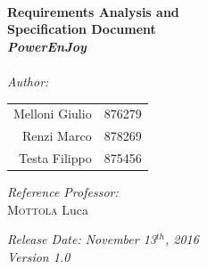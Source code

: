 \begin{titlepage}
\HRule \\[0.4cm]
{ \huge \bfseries Requirements Analysis and\\Specification Document\\[0.5cm]\textit{PowerEnJoy}}\\[0.4cm] %
\HRule \\[1.5cm]
 
\Large \emph{Author:}\\
\LARGE{
\begin{center}
\begin{tabular}{ r  l }
	Melloni Giulio & 876279\\
	Renzi Marco & 878269\\
	Testa Filippo & 875456 \\
\end{tabular}
\end{center}
}
\vspace*{0.8cm}
\Large{\emph{Reference Professor:} \\
{\textsc{Mottola} Luca} 
}

 \vspace*{1cm}
{\LARGE {\it Release Date: November 13$^{th}$, 2016\\Version 1.0}}

\end{titlepage}
